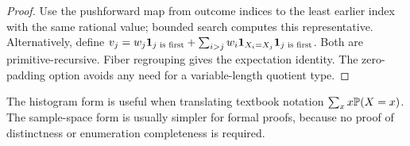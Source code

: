 \begin{proof}
Use the pushforward map from outcome indices to the least earlier index with
the same rational value; bounded search computes this representative.
Alternatively, define
\(v_j=w_j\mathbf 1_{j\text{ is first}}+\sum_{i>j}w_i\mathbf 1_{X_i=X_j}\mathbf 1_{j\text{ is first}}\).
Both are primitive-recursive.  Fiber regrouping gives the expectation identity.
The zero-padding option avoids any need for a variable-length quotient type.
\end{proof}

\begin{remark}
The histogram form is useful when translating textbook notation
\(\sum_x x\mathbb P(X=x)\).  The sample-space form is usually simpler for formal
proofs, because no proof of distinctness or enumeration completeness is
required.
\end{remark}
